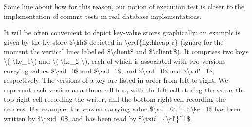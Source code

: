 \ac{Some line about how for this reason, our notion of execution test is closer 
to the implementation of commit tests in real database implementations.}



\ac{
It will be often convenient to depict key-value stores graphically: an 
example is given by the kv-store $\hh$ depicted in \cref{fig:hheap-a}
(ignore for the moment the vertical lines labelled $\client$ and $\client'$).
It comprises two keys \( \ke_1\) and \( \ke_2 \), 
each of which is associated with two versions carrying values $\val_0$ and $\val_1$, and $\val'_0$ and $\val'_1$, respectively.
The versions of a key are listed in order from left to right. 
We represent each version as a three-cell box, with the left cell storing the value, the top right cell recording the writer, and the bottom right cell recording the readers. 
For example, the version carrying value $\val_0$ in $\ke_1$ has been written by $\txid_0$, and has been read by $\txid_{\cl'}^1$.
}


%
%


